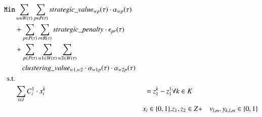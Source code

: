 \documentclass[preprint,12pt,authoryear]{elsarticle}
\begin{document}
\begin{alignat}{4}   
\texttt{Min}& 
 \sum_{w \in W(\tau)} \sum_{p \in P(\tau)} strategic\_value_{w p}(\tau) \cdot \alpha_{wp}(\tau) \notag \\
 & + \sum_{p \in P(\tau)} \sum_{r \in R(\tau)} strategic\_penalty \cdot \epsilon_{pr}(\tau) \notag \\
 & + \sum_{p \in P(\tau)} \sum_{w1 \in W(\tau)} \sum_{w2 \in W(\tau)} \notag \\
 & \quad clustering\_value_{w1, w2} \cdot \alpha_{w1p}(\tau) \cdot \alpha_{w2p}(\tau)   
 \label{eqn:objective_function_strategic} \\
 \text{s.t.}	\notag\\
 				& \sum_{i \in I} C^{1}_i \cdot x^k_i & = z^k_1 - z^1_1 & \forall k \in K \label{mod3:setz1}\\
 &				& x_i \in \{0,1\},&z_1,z_2 \in Z+& v_{l,m},y_{k,l,m} \in \{0,1\} \label{mod3:domain}
\end{alignat}
\end{document}
